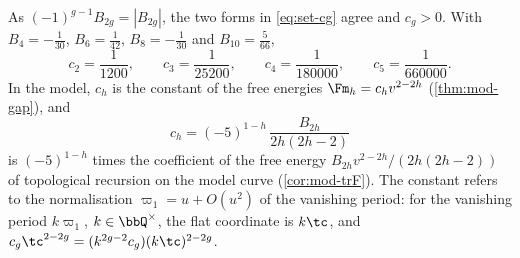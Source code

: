\begin{rmk}
\label{rmk:set-cg}
As $(-1)^{g-1}B_{2g}=|B_{2g}|$, the two forms in \eqref{eq:set-cg} agree and $c_g>0$. With $B_4=-\frac1{30}$, $B_6=\frac1{42}$, $B_8=-\frac1{30}$ and $B_{10}=\frac5{66}$,
\[
c_2=\frac1{1200},\qquad c_3=\frac1{25200},\qquad c_4=\frac1{180000},\qquad c_5=\frac1{660000}.
\]
In the model, $c_h$ is the constant of the free energies $\Fm_h=c_hv^{2-2h}$ (\cref{thm:mod-gap}), and
\[
c_h=(-5)^{1-h}\,\frac{B_{2h}}{2h(2h-2)}
\]
is $(-5)^{1-h}$ times the coefficient of the free energy $B_{2h}v^{2-2h}/(2h(2h-2))$ of topological recursion on the model curve (\cref{cor:mod-trF}). The constant refers to the normalisation $\varpi_1=u+O(u^2)$ of the vanishing period: for the vanishing period $k\varpi_1$, $k\in\bbQ^\times$, the flat coordinate is $k\tc$, and $c_g\tc^{2-2g}=(k^{2g-2}c_g)(k\tc)^{2-2g}$.
\end{rmk}
